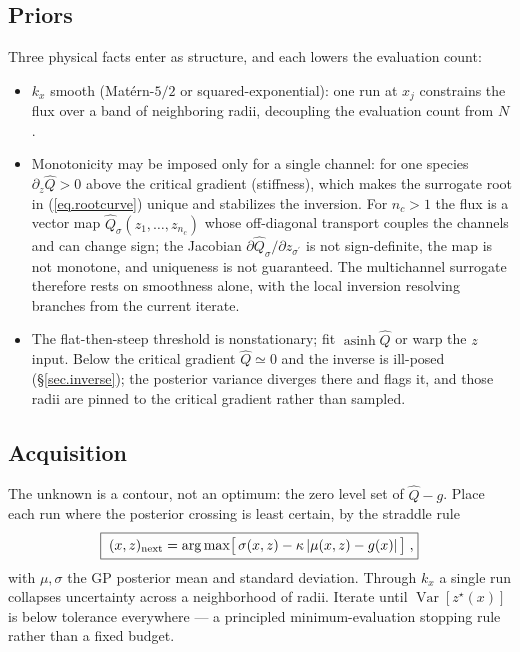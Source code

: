 \documentclass[12pt]{article}
\newcommand\qhat{\widehat{Q}}
\begin{document}
\subsection{Priors}

Three physical facts enter as structure, and each lowers the evaluation
count:
%
\begin{itemize}
\item $k_x$ smooth (Mat\'ern-$5/2$ or squared-exponential): one run at
$x_j$ constrains the flux over a band of neighboring radii, decoupling
the evaluation count from $N$.
\item Monotonicity may be imposed only for a single channel: for one
species $\partial_z \qhat > 0$ above the critical gradient (stiffness),
which makes the surrogate root in (\ref{eq.rootcurve}) unique and
stabilizes the inversion.  For $n_c > 1$ the flux is a vector map
$\qhat_\sigma(z_1,\dots,z_{n_c})$ whose off-diagonal transport couples
the channels and can change sign; the Jacobian $\partial \qhat_\sigma /
\partial z_{\sigma^\prime}$ is not sign-definite, the map is not
monotone, and uniqueness is not guaranteed.  The multichannel surrogate
therefore rests on smoothness alone, with the local inversion resolving
branches from the current iterate.
\item The flat-then-steep threshold is nonstationary; fit
$\operatorname{asinh} \qhat$ or warp the $z$ input.  Below the critical
gradient $\qhat \simeq 0$ and the inverse is ill-posed
(\S\ref{sec.inverse}); the posterior variance diverges there and flags
it, and those radii are pinned to the critical gradient rather than
sampled.
\end{itemize}

\subsection{Acquisition}

The unknown is a contour, not an optimum: the zero level set of $\qhat -
g$.  Place each run where the posterior crossing is least certain, by the
straddle rule
%
\begin{equation}
\boxed{\;
(x,z)_{\rm next} = \arg\max \bigl[\, \sigma(x,z)
 - \kappa \, | \mu(x,z) - g(x) | \,\bigr] \; , }
\label{eq.straddle}
\end{equation}
%
with $\mu,\sigma$ the GP posterior mean and standard deviation.  Through
$k_x$ a single run collapses uncertainty across a neighborhood of radii.
Iterate until $\operatorname{Var}[ z^\star(x) ]$ is below tolerance
everywhere --- a principled minimum-evaluation stopping rule rather than
a fixed budget.
\end{document}
